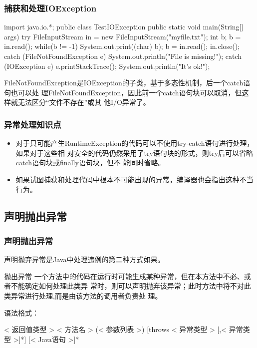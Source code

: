 \documentclass[compress,table]{beamer} %
\begin{document}
\begin{frame}[fragile] %
\frametitle{捕获和处理IOException}
\begin{javaCode}
import java.io.*;
public class TestIOException {
  public static void main(String[] args) {
    try {
      FileInputStream in = new FileInputStream("myfile.txt");
      int b;
      b = in.read();
      while(b != -1) {
        System.out.print((char) b);
        b = in.read();
      }
      in.close();
    } catch (FileNotFoundException e) {
      System.out.println("File is missing!");
    } catch (IOException e) {
      e.printStackTrace();
    }
    System.out.println("It's ok!");
  }
}
\end{javaCode}
FileNotFoundException是IOException的子类，基于多态性机制，后一个catch语句也可以处
理FileNotFoundException，因此前一个catch语句块可以取消，但这样就无法区分“文件不存在”或其
他I/O异常了。
\end{frame}

\begin{frame}[fragile] %
\frametitle{异常处理知识点}
\begin{itemize}
\item 对于只可能产生RuntimeException的代码可以不使用try-catch语句进行处理，如果对于这些相
  对安全的代码仍然采用了try语句块的形式，则try后可以省略catch语句块或finally语句块，但不
  能同时省略。
\item 如果试图捕获和处理代码中根本不可能出现的异常，编译器也会指出这种不当行为。
\end{itemize}
\end{frame}

\subsection{声明抛出异常}
\begin{frame}[fragile] %
\frametitle{声明抛出异常}

声明抛弃异常是Java中处理违例的第二种方式如果。
\begin{block}{抛出异常}
  一个方法中的代码在运行时可能生成某种异常，但在本方法中不必、或者不能确定如何处理此类异
  常时，则可以声明抛弃该异常；此时方法中将不对此类异常进行处理,而是由该方法的调用者负责处
  理。
\end{block}
语法格式：
\begin{javaCode}
[< 修饰符 >] < 返回值类型 > < 方法名 > (< 参数列表 >) [throws < 异常类型 > 
[,< 异常类型 >]*] {
  [< Java语句 >]*
}
\end{javaCode}
\end{frame}
\end{document}
